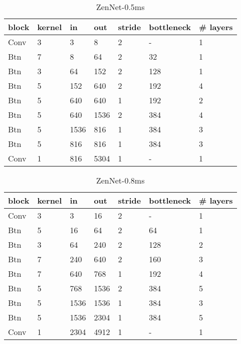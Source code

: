 \documentclass{article}
\providecommand{\tabularnewline}{\\}
\providecommand{\tabularnewline}{\\}
\begin{document}
\begin{table}[!h]
 \begin{center}
   \begin{tabular}{lllllll}
     \toprule 
     block & kernel & in & out & stride & bottleneck & \# layers\tabularnewline
     \midrule
     \midrule
Conv & 3 & 3 & 8 & 2 & - & 1\tabularnewline
\midrule
Btn & 7 & 8 & 64 & 2 & 32 & 1\tabularnewline
\midrule
Btn & 3 & 64 & 152 & 2 & 128 & 1\tabularnewline
\midrule
Btn & 5 & 152 & 640 & 2 & 192 & 4\tabularnewline
\midrule
Btn & 5 & 640 & 640 & 1 & 192 & 2\tabularnewline
\midrule
Btn & 5 & 640 & 1536 & 2 & 384 & 4\tabularnewline
\midrule
Btn & 5 & 1536 & 816 & 1 & 384 & 3\tabularnewline
\midrule
Btn & 5 & 816 & 816 & 1 & 384 & 3\tabularnewline
\midrule
Conv & 1 & 816 & 5304 & 1 & - & 1\tabularnewline
     \bottomrule
     \end{tabular}
 \end{center}
 \caption{ZenNet-0.5ms}
 \label{tab:struct-ZenNet-0.5ms}
\end{table}

\begin{table}[!h]
 \begin{center}
   \begin{tabular}{lllllll}
     \toprule 
     block & kernel & in & out & stride & bottleneck & \# layers\tabularnewline
     \midrule
     \midrule
     Conv & 3 & 3 & 16 & 2 & - & 1\tabularnewline
     \midrule
     Btn & 5 & 16 & 64 & 2 & 64 & 1\tabularnewline
     \midrule
     Btn & 3 & 64 & 240 & 2 & 128 & 2\tabularnewline
     \midrule
     Btn & 7 & 240 & 640 & 2 & 160 & 3\tabularnewline
     \midrule
     Btn & 7 & 640 & 768 & 1 & 192 & 4\tabularnewline
     \midrule
     Btn & 5 & 768 & 1536 & 2 & 384 & 5\tabularnewline
     \midrule
     Btn & 5 & 1536 & 1536 & 1 & 384 & 3\tabularnewline
     \midrule
     Btn & 5 & 1536 & 2304 & 1 & 384 & 5\tabularnewline
     \midrule
     Conv & 1 & 2304 & 4912 & 1 & - & 1\tabularnewline
     \bottomrule
     \end{tabular}
 \end{center}
 \caption{ZenNet-0.8ms}
 \label{tab:struct-ZenNet-0.8ms}
\end{table}
\end{document}
